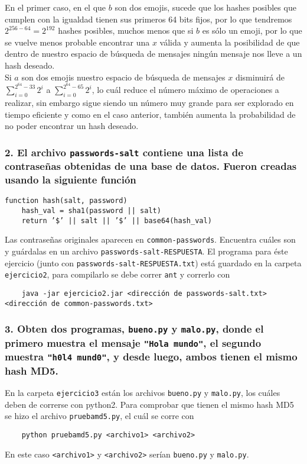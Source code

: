 \documentclass[14pt]{article}
\begin{document}
En el primer caso, en el que $b$ son dos emojis, sucede que los hashes posibles que cumplen con la igualdad tienen sus primeros 64 bits fijos, por lo que tendremos $2^{256 - 64} = 2 ^ {192}$ hashes posibles, muchos menos que si $b$ es sólo un emoji, por lo que se vuelve menos probable encontrar una $x$ válida y aumenta la posibilidad de que dentro de nuestro espacio de búsqueda de mensajes ningún mensaje nos lleve a un hash deseado. \\

Si $a$ son dos emojis nuestro espacio de búsqueda de mensajes $x$ disminuirá de $\sum_{i = 0}^{2^{64} - 33}2^i$ a $\sum_{i = 0}^{2^{64} - 65}2^i$, lo cuál reduce el número máximo de operaciones a realizar, sin embargo sigue siendo un número muy grande para ser explorado en tiempo eficiente y como en el caso anterior, también aumenta la probabilidad de no poder encontrar un hash deseado.

\subsubsection*{2. El archivo \texttt{passwords-salt} contiene una lista de contraseñas obtenidas de una base de datos. Fueron creadas usando la siguiente función}
\begin{verbatim}
function hash(salt, password)
    hash_val = sha1(password || salt)
    return ’$’ || salt || ’$’ || base64(hash_val)
\end{verbatim}
Las contraseñas originales aparecen en \texttt{common-passwords}. Encuentra cuáles son y guárdalas en un archivo \texttt{passwords-salt-RESPUESTA}.
El programa para éste ejercicio (junto con \texttt{passwords-salt-RESPUESTA.txt}) está guardado en la carpeta \texttt{ejercicio2}, para compilarlo se debe correr \texttt{ant} y correrlo con
\begin{verbatim}
    java -jar ejercicio2.jar <dirección de passwords-salt.txt> <dirección de common-passwords.txt>
\end{verbatim}

\subsubsection*{3. Obten dos programas, \texttt{bueno.py} y \texttt{malo.py}, donde el primero muestra el mensaje \texttt{"Hola mundo"}, el segundo muestra \texttt{"h0l4 mund0"}, y desde luego, ambos tienen el mismo hash MD5.}
En la carpeta \texttt{ejercicio3} están los archivos \texttt{bueno.py} y \texttt{malo.py}, los cuáles deben de correrse con \textsf{python2}. Para comprobar que tienen el mismo hash MD5 se hizo el archivo \texttt{pruebamd5.py}, el cuál se corre con 
\begin{verbatim}
    python pruebamd5.py <archivo1> <archivo2>
\end{verbatim}
En este caso \texttt{<archivo1>} y \texttt{<archivo2>} serían \texttt{bueno.py} y \texttt{malo.py}.
\end{document}
